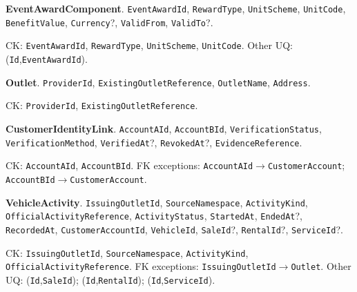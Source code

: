 \par\vspace{2.0pt}\noindent\textbf{EventAwardComponent}. \texttt{Event\allowbreak{}Award\allowbreak{}Id}, \texttt{Reward\allowbreak{}Type}, \texttt{Unit\allowbreak{}Scheme}, \texttt{Unit\allowbreak{}Code}, \texttt{Benefit\allowbreak{}Value}, \texttt{Currency}?, \texttt{Valid\allowbreak{}From}, \texttt{Valid\allowbreak{}To}?.\par\noindent CK: \texttt{Event\allowbreak{}Award\allowbreak{}Id}, \texttt{Reward\allowbreak{}Type}, \texttt{Unit\allowbreak{}Scheme}, \texttt{Unit\allowbreak{}Code}. Other UQ: (\texttt{Id},\texttt{Event\allowbreak{}Award\allowbreak{}Id}).
\par\vspace{2.0pt}\noindent\textbf{Outlet}. \texttt{Provider\allowbreak{}Id}, \texttt{Existing\allowbreak{}Outlet\allowbreak{}Reference}, \texttt{Outlet\allowbreak{}Name}, \texttt{Address}.\par\noindent CK: \texttt{Provider\allowbreak{}Id}, \texttt{Existing\allowbreak{}Outlet\allowbreak{}Reference}.
\par\vspace{2.0pt}\noindent\textbf{CustomerIdentityLink}. \texttt{Account\allowbreak{}AId}, \texttt{Account\allowbreak{}BId}, \texttt{Verification\allowbreak{}Status}, \texttt{Verification\allowbreak{}Method}, \texttt{Verified\allowbreak{}At}?, \texttt{Revoked\allowbreak{}At}?, \texttt{Evidence\allowbreak{}Reference}.\par\noindent CK: \texttt{Account\allowbreak{}AId}, \texttt{Account\allowbreak{}BId}. FK exceptions: \texttt{Account\allowbreak{}AId}$\to$\texttt{Customer\allowbreak{}Account}; \texttt{Account\allowbreak{}BId}$\to$\texttt{Customer\allowbreak{}Account}.
\par\vspace{2.0pt}\noindent\textbf{VehicleActivity}. \texttt{Issuing\allowbreak{}Outlet\allowbreak{}Id}, \texttt{Source\allowbreak{}Namespace}, \texttt{Activity\allowbreak{}Kind}, \texttt{Official\allowbreak{}Activity\allowbreak{}Reference}, \texttt{Activity\allowbreak{}Status}, \texttt{Started\allowbreak{}At}, \texttt{Ended\allowbreak{}At}?, \texttt{Recorded\allowbreak{}At}, \texttt{Customer\allowbreak{}Account\allowbreak{}Id}, \texttt{Vehicle\allowbreak{}Id}, \texttt{Sale\allowbreak{}Id}?, \texttt{Rental\allowbreak{}Id}?, \texttt{Service\allowbreak{}Id}?.\par\noindent CK: \texttt{Issuing\allowbreak{}Outlet\allowbreak{}Id}, \texttt{Source\allowbreak{}Namespace}, \texttt{Activity\allowbreak{}Kind}, \texttt{Official\allowbreak{}Activity\allowbreak{}Reference}. FK exceptions: \texttt{Issuing\allowbreak{}Outlet\allowbreak{}Id}$\to$\texttt{Outlet}. Other UQ: (\texttt{Id},\texttt{Sale\allowbreak{}Id}); (\texttt{Id},\texttt{Rental\allowbreak{}Id}); (\texttt{Id},\texttt{Service\allowbreak{}Id}).
